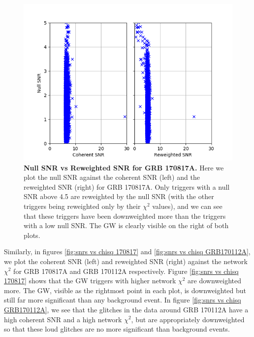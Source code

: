\documentclass[11pt]{cuthesis}
\begin{document}
\begin{figure} %
\begin{center}
\includegraphics[width=0.8\linewidth]{network_snrs_vs_null_170817.png}
\end{center}
\caption{\textbf{Null SNR vs Reweighted SNR for GRB 170817A.} Here we plot the null SNR against the coherent SNR (left) and the reweighted SNR (right) for GRB 170817A. Only triggers with a null SNR above 4.5 are reweighted by the null SNR (with the other triggers being reweighted only by their $\chi^2$ values), and we can see that these triggers have been downweighted more than the triggers with a low null SNR. The GW is clearly visible on the right of both plots.} 
\label{fig:null vs snrs 170817}
\end{figure}

Similarly, in figures \ref{fig:snrs vs chisq 170817} and \ref{fig:snrs vs chisq GRB170112A}, we plot the coherent SNR (left) and reweighted SNR (right) against the network $\chi^2$ for GRB 170817A and GRB 170112A respectively. Figure \ref{fig:snrs vs chisq 170817} shows that the GW triggers with higher network $\chi^2$ are downweighted more. The GW, visible as the rightmost point in each plot, is downweighted but still far more significant than any background event. In figure \ref{fig:snrs vs chisq GRB170112A}, we see that the glitches in the data around GRB 170112A have a high coherent SNR and a high network $\chi^2$, but are appropriately downweighted so that these loud glitches are no more significant than background events. 
\end{document}
